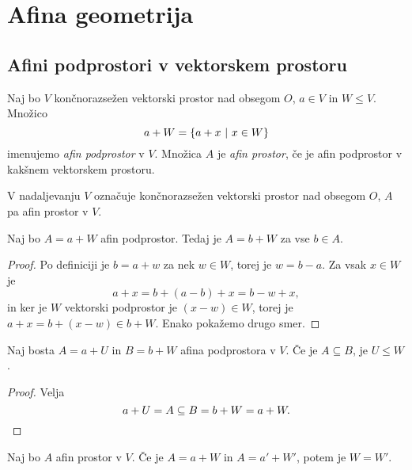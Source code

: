 \section{Afina geometrija}

\subsection{Afini podprostori v vektorskem prostoru}


\begin{definicija}
    Naj bo $V$ končnorazsežen vektorski prostor nad obsegom $O$, $a \in V$ in $W \leq V$. Množico
    \[
    a + W = \left\{a + x~\middle\vert~x \in W\right\}
    \]
    imenujemo \emph{afin podprostor} v $V$.
    Množica $A$ je \emph{afin prostor}, če je afin podprostor v kakšnem vektorskem prostoru.
\end{definicija}

\begin{opomba}
    V nadaljevanju $V$ označuje končnorazsežen vektorski prostor nad obsegom $O$, $A$ pa afin prostor v $V$.
\end{opomba}

\begin{lema}
    Naj bo $A = a + W$ afin podprostor. Tedaj je $A = b + W$ za vse $b \in A$.
\end{lema}

\begin{proof}
    Po definiciji je $b = a + w$ za nek $w \in W$, torej je $w = b - a$. Za vsak $x \in W$ je
    \[
    a + x = b + (a - b) + x = b - w + x,
    \]
    in ker je $W$ vektorski podprostor je $(x - w) \in W$, torej je $a + x = b + (x - w) \in b + W$. Enako pokažemo drugo smer.
\end{proof}

\begin{posledica}
    Naj bosta $A = a + U$ in $B = b + W$ afina podprostora v $V$. Če je $A \subseteq B$, je $U \leq W$.
\end{posledica}

\begin{proof}
	Velja
	\[    
    a + U = A \subseteq B = b + W = a + W. \qedhere
    \]
\end{proof}

\begin{posledica}
    Naj bo $A$ afin prostor v $V$. Če je $A = a + W$ in $A = a' + W'$, potem je $W = W'$.
\end{posledica}

